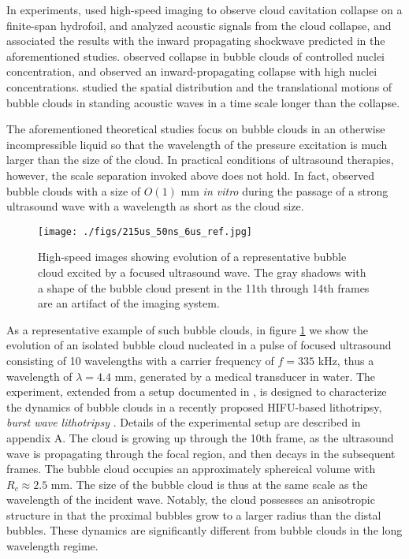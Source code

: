 \documentclass{jfm}
\begin{document}
In experiments, \citet{Reisman98} used high-speed imaging to observe cloud cavitation collapse on a finite-span hydrofoil, and analyzed acoustic signals from the cloud collapse, and associated the results with the inward propagating shockwave predicted in the aforementioned studies.
\citet{Arora07} observed collapse in bubble clouds of controlled nuclei concentration, and observed an inward-propagating collapse with high nuclei concentrations. \citet{Lu13} studied the spatial distribution and the translational motions of bubble clouds in standing acoustic waves in a time scale longer than the collapse.

The aforementioned theoretical studies focus on bubble clouds in an otherwise incompressible liquid so that the wavelength of the pressure excitation is much larger than the size of the cloud.
In practical conditions of ultrasound therapies, however, the scale separation invoked above does not hold.
In fact, \citet{Maeda15} observed bubble clouds with a size of $O(1)$ mm {\it{in vitro}} during the passage of a strong ultrasound wave with a wavelength as short as the cloud size.

\begin{figure}
  \center
  \texttt{[image: ./figs/215us\_50ns\_6us\_ref.jpg]}
  \caption{High-speed images showing evolution of a representative bubble cloud excited by a focused ultrasound wave. The gray shadows with a shape of the bubble cloud present in the 11th through 14th frames are an artifact of the imaging system.}
   \label{fig:imacon} 
\end{figure}
As a representative example of such bubble clouds, in figure \ref{fig:imacon} we show the evolution of an isolated bubble cloud nucleated in a pulse of focused ultrasound consisting of 10 wavelengths with a carrier frequency of $f=335$ kHz, thus a wavelength of $\lambda=4.4$ mm, generated by a medical transducer in water.
The experiment, extended from a setup documented in \citet{Maeda15}, is designed to characterize the dynamics of bubble clouds in a recently proposed HIFU-based lithotripsy, {\itshape{burst wave lithotripsy}} \citep{Maxwell15}. Details of the experimental setup are described in appendix A.
The cloud is growing up through the 10th frame, as the ultrasound wave is propagating through the focal region, and then decays in the subsequent frames.
The bubble cloud occupies an approximately sphereical volume with $R_c\approx 2.5$ mm.
The size of the bubble cloud is thus at the same scale as the wavelength of the incident wave.
Notably, the cloud possesses an anisotropic structure in that the proximal bubbles grow to a larger radius than the distal bubbles.
These dynamics are significantly different from bubble clouds in the long wavelength regime.
\end{document}
